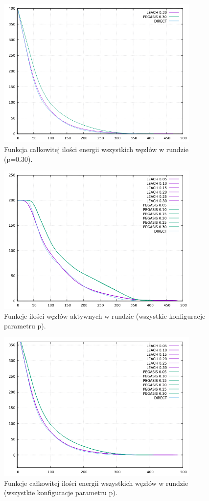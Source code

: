 \documentclass[a4paper,12pt,twoside,openany]{report}
\begin{document}
\begin{figure}[H]
 \centering
 \includegraphics[width=10cm]{images/gnuplot/test_4/energy_in_round_p030.png}
 \caption{Funkcja całkowitej ilości energii wszystkich węzłów w rundzie (p=0.30).}
\end{figure}

\begin{figure}[H]
 \centering
 \includegraphics[width=10cm]{images/gnuplot/test_4/nodes_in_round_all.png}
 \caption{Funkcje ilości węzłów aktywnych w rundzie (wszystkie konfiguracje parametru p).}
\end{figure}

\begin{figure}[H]
 \centering
 \includegraphics[width=10cm]{images/gnuplot/test_4/energy_in_round_all.png}
 \caption{Funkcje całkowitej ilości energii wszystkich węzłów w rundzie (wszystkie konfiguracje parametru p).}
\end{figure}
\end{document}
